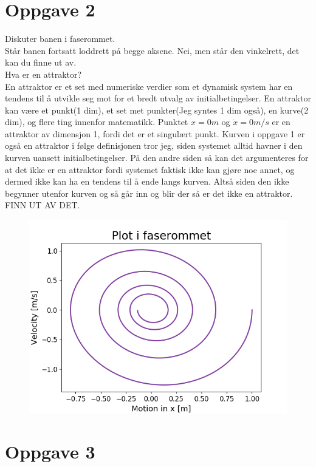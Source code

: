 \documentclass[norsk,a4paper,12pt]{article}
\begin{document}
\section*{Oppgave 2}
Diskuter banen i faserommet.
\\
Står banen fortsatt loddrett på begge aksene. Nei, men står den vinkelrett, det kan du finne ut av.
\\
Hva er en attraktor?
\\
En attraktor er et set med numeriske verdier som et dynamisk system har en tendens til å utvikle seg mot for et bredt utvalg av initialbetingelser. En attraktor kan være et punkt(1 dim), et set met punkter(Jeg syntes 1 dim også), en kurve(2 dim), og flere ting innenfor matematikk. Punktet $x=0m$ og $\dot{x}=0m/s$ er en attraktor av dimensjon 1, fordi det er et singulært punkt. Kurven i oppgave 1 er også en attraktor i følge definisjonen tror jeg, siden systemet alltid havner i den kurven uansett initialbetingelser. På den andre siden så kan det argumenteres for at det ikke er en attraktor fordi systemet faktisk ikke kan gjøre noe annet, og dermed ikke kan ha en tendens til å ende langs kurven. Altså siden den ikke begynner utenfor kurven og så går inn og blir der så er det ikke en attraktor. FINN UT AV DET.



\begin{figure}[H]
\includegraphics[scale=0.8]{Oppgave2.png}
\end{figure}


\section*{Oppgave 3}
\end{document}
